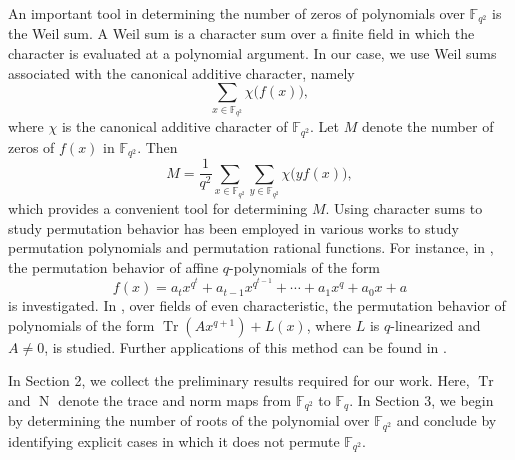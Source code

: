 \documentclass[12pt]{amsart}
\theoremstyle{definition}
\theoremstyle{remark}
\numberwithin{equation}{section}
\begin{document}
    An important tool in determining the number of zeros of polynomials over $\mathbb{F}_{q^2}$ is the Weil sum. A Weil sum is a character sum over a finite field in which the character is evaluated at a polynomial argument. In our case, we use Weil sums associated with the canonical additive character, namely
$$
\sum_{x \in \mathbb{F}_{q^2}} \chi\big(f(x)\big),
$$
where $\chi$ is the canonical additive character of $\mathbb{F}_{q^2}.$
Let $M$ denote the number of zeros of $f(x)$ in $\mathbb{F}_{q^2}$. Then
$$
M = \frac{1}{q^2} \sum_{x \in \mathbb{F}_{q^2}} \sum_{y \in \mathbb{F}_{q^2}} \chi\big(y f(x)\big),
$$
which provides a convenient tool for determining $M$. Using character sums to study permutation behavior has been employed in various works to study permutation polynomials and permutation rational functions. For instance, in \cite{pp1}, the permutation behavior of affine $q$-polynomials of the form
$$
f(x) = a_t x^{q^t} + a_{t-1} x^{q^{t-1}} + \cdots + a_1 x^q + a_0 x + a
$$
is investigated. In \cite{pp2}, over fields of even characteristic, the permutation behavior of polynomials of the form $\operatorname{Tr}(A x^{q+1}) + L(x)$, where $L$ is $q$-linearized and $A\neq 0$, is studied. Further applications of this method can be found in \cite{r1}.

In Section 2, we collect the preliminary results required for our work. Here, $\operatorname{Tr}$ and $\operatorname{N}$ denote the trace and norm maps from $\mathbb{F}_{q^2}$ to $\mathbb{F}_q$. In Section 3, we begin by determining the number of roots of the polynomial over $\mathbb{F}_{q^2}$ and conclude by identifying explicit cases in which it does not permute $\mathbb{F}_{q^2}$.
\end{document}
